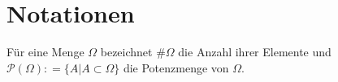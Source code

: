 
\section{Notationen}

Für eine Menge $\Omega$ bezeichnet $\# \Omega$ die Anzahl ihrer Elemente und $\mathcal{P} (\Omega) : = \{ A | A \subset \Omega \}$ die Potenzmenge von $\Omega$. 



\newpage